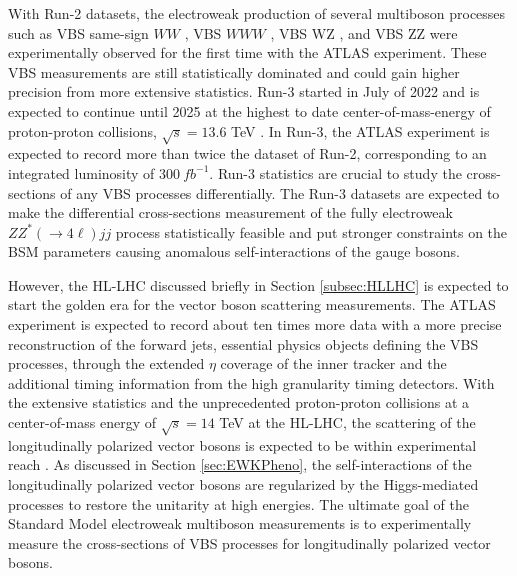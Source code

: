 With Run-2 datasets, the electroweak production of several multiboson processes such as VBS same-sign $WW$ \cite{EWk_ssWW}, VBS $WWW$ \cite{EWK_WWW}, VBS WZ \cite{EWK_WZ}, and VBS ZZ \cite{ATLASZZjj} were experimentally observed for the first time with the ATLAS experiment. These VBS measurements are still statistically dominated and could gain higher precision from more extensive statistics. Run-3 started in July of 2022 and is expected to continue until 2025 at the highest to date center-of-mass-energy of proton-proton collisions, $\sqrt{s}=13.6$ TeV \cite{Run3}. In Run-3, the ATLAS experiment is expected to record more than twice the dataset of Run-2, corresponding to an integrated luminosity of $300 ~fb^{-1}$. Run-3 statistics are crucial to study the cross-sections of any VBS processes differentially. The Run-3 datasets are expected to make the differential cross-sections measurement of the fully electroweak $ZZ^*(\rightarrow 4\ell) jj$ process statistically feasible and put stronger constraints on the BSM parameters causing anomalous self-interactions of the gauge bosons. 

However, the HL-LHC discussed briefly in Section \ref{subsec:HLLHC} is expected to start the golden era for the vector boson scattering measurements. The ATLAS experiment is expected to record about ten times more data with a more precise reconstruction of the forward jets, essential physics objects defining the VBS processes, through the extended $\eta$ coverage of the inner tracker and the additional timing information from the high granularity timing detectors. With the extensive statistics and the unprecedented proton-proton collisions at a center-of-mass energy of $\sqrt{s}=14$ TeV at the HL-LHC, the scattering of the longitudinally polarized vector bosons is expected to be within experimental reach \cite{ssWW_HLLHCProspects}. As discussed in Section \ref{sec:EWKPheno}, the self-interactions of the longitudinally polarized vector bosons are regularized by the Higgs-mediated processes to restore the unitarity at high energies. The ultimate goal of the Standard Model electroweak multiboson measurements is to experimentally measure the cross-sections of VBS processes for longitudinally polarized vector bosons.